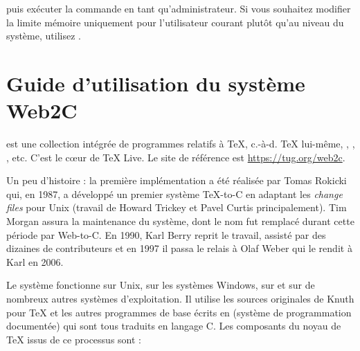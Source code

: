 \documentclass[german, english, french]{article}
\renewcommand{\TL}{\TeX{} Live\xspace}%
\begin{document}
\noindent puis exécuter la commande  en tant
qu'administrateur. Si vous souhaitez modifier la limite mémoire uniquement pour
l'utilisateur courant plutôt qu'au niveau du système, utilisez
.


\section{Guide d'utilisation du système Web2C}

\Webc{} est une collection intégrée de programmes relatifs à \TeX,
c.-à-d. \TeX{} lui-même, \MF{}, \MP, \BibTeX{}, etc.  C'est le cœur de \TL{}. Le
site de référence est \url{https://tug.org/web2c}.

Un peu d'histoire : la première implémentation a été réalisée par Tomas Rokicki
qui, en 1987, a développé un premier système \TeX{}-to-C en adaptant les
\textit{change files} pour Unix (travail de Howard Trickey et Pavel Curtis
principalement).  Tim Morgan assura la maintenance du système, dont le nom fut
remplacé durant cette période par Web-to-C.  En 1990, Karl Berry reprit le
travail, assisté par des dizaines de contributeurs et en 1997 il passa le relais
à Olaf Weber qui le rendit à Karl en 2006.

Le système \Webc{} fonctionne sur Unix, sur les systèmes Windows, sur
\macOS{} et sur de nombreux autres systèmes d'exploitation.  Il utilise les
sources originales de Knuth pour \TeX{} et les autres programmes de base écrits
en \web{} (système de programmation documentée) qui sont tous traduits en
langage C. Les composants du noyau de \TeX{} issus de ce processus sont :
\end{document}
